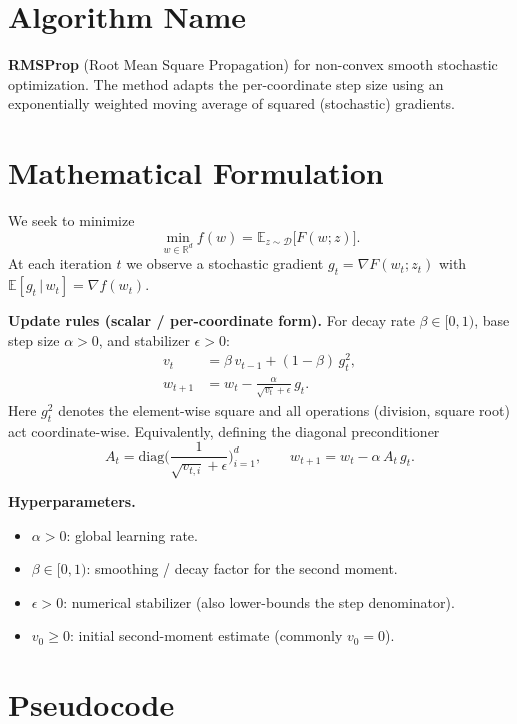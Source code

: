 \documentclass[11pt]{article}
\begin{document}
\section*{Algorithm Name}
\textbf{RMSProp} (Root Mean Square Propagation) for non-convex smooth stochastic
optimization. The method adapts the per-coordinate step size using an
exponentially weighted moving average of squared (stochastic) gradients.

\section*{Mathematical Formulation}

We seek to minimize
\[
\min_{w\in\mathbb{R}^d} f(w) = \mathbb{E}_{z\sim\mathcal{D}}\big[ F(w;z) \big].
\]
At each iteration $t$ we observe a stochastic gradient
$g_t = \nabla F(w_t;z_t)$ with $\mathbb{E}[g_t\,|\,w_t] = \nabla f(w_t)$.

\textbf{Update rules (scalar / per-coordinate form).}
For decay rate $\beta\in[0,1)$, base step size $\alpha>0$, and stabilizer
$\epsilon>0$:
\begin{align}
v_t &= \beta\, v_{t-1} + (1-\beta)\, g_t^2, \label{eq:v}\\[2pt]
w_{t+1} &= w_t - \frac{\alpha}{\sqrt{v_t}+\epsilon}\, g_t. \label{eq:w}
\end{align}
Here $g_t^2$ denotes the element-wise square and all operations
(division, square root) act coordinate-wise. Equivalently, defining the
diagonal preconditioner
\[
A_t = \mathrm{diag}\!\Big(\frac{1}{\sqrt{v_{t,i}}+\epsilon}\Big)_{i=1}^d,
\qquad
w_{t+1} = w_t - \alpha\, A_t\, g_t.
\]

\textbf{Hyperparameters.}
\begin{itemize}
  \item $\alpha>0$: global learning rate.
  \item $\beta\in[0,1)$: smoothing / decay factor for the second moment.
  \item $\epsilon>0$: numerical stabilizer (also lower-bounds the step
        denominator).
  \item $v_0 \ge 0$: initial second-moment estimate (commonly $v_0=0$).
\end{itemize}

\section*{Pseudocode}
\end{document}
